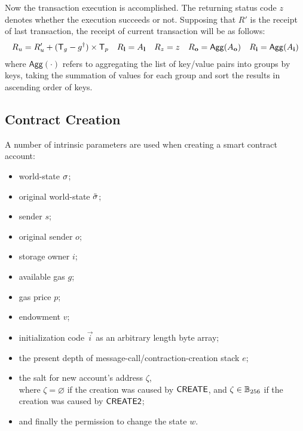 Now the transaction execution is accomplished.
The returning status code $z$ denotes whether the execution succeeds or not. 
Supposing that $R'$ is the receipt of last transaction, 
the receipt of current transaction will be as follows:
\begin{align}
	R_u=R'_u+(\textsf{T}_g-g^{\dagger})\times\textsf{T}_p && R_{\bf l}=A_{\bf l} && R_z=z && R_{\bf o}=\mathsf{Agg}(A_{\bf o}) && R_{\bf i}=\mathsf{Agg}(A_{\bf i})
\end{align}
%
where $\mathsf{Agg}(\cdot)$ refers to aggregating the list of key/value pairs into groups by keys, taking the summation of values for each group and sort the results in ascending order of keys.



\subsection{Contract Creation}
\label{sec:creation}

A number of intrinsic parameters are used when creating a smart contract account:
\begin{itemize}[nosep]
	\item world-state ${\mathbf{\sigma}}$;
	
	\item original world-state $\tilde{\mathbf{\sigma}}$;

	\item sender $s$;

	\item original sender $o$;
	
	\item storage owner $i$;
		
	\item available gas $g$;


	\item gas price $p$;

	\item endowment $v$;

	\item initialization code $\vec{i}$ as an arbitrary length byte array;

	\item the present depth of message-call/contraction-creation stack $e$;

	\item the salt for new account's address $\zeta$,\\
	where $\zeta = \varnothing$ if the creation was caused by {\hyperlink{create}{$\mathsf{CREATE}$}}, 
	and $\zeta\in \mathbb{B}_{256}$ if the creation was caused by {\hyperlink{create2}{$\mathsf{CREATE2}$}};

	\item and finally the permission to change the state $w$.
\end{itemize}


